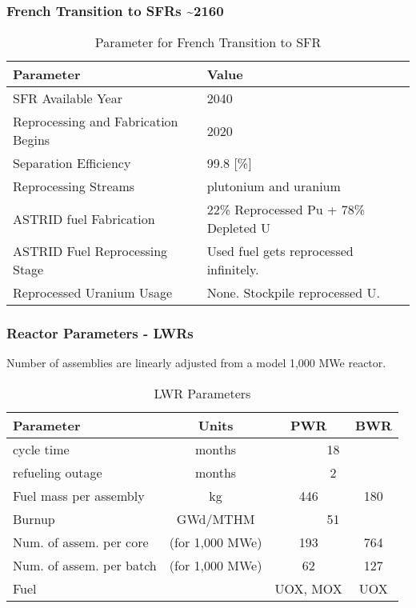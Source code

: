 \begin{frame}
    \frametitle{French Transition to SFRs \textasciitilde 2160}
    
\begin{table}[h]
    \centering
    \begin{tabularx}{\textwidth}{bb}
        \hline
        Parameter & Value \\
        \hline
        \gls{SFR} Available Year & 2040 \\
        Reprocessing and Fabrication Begins & 2020 \\
        Separation Efficiency & 99.8 [\%] \\
        Reprocessing Streams & plutonium and uranium \\
        ASTRID fuel Fabrication &  \small{22\% Reprocessed Pu + 78\% Depleted U}  \\
        ASTRID Fuel Reprocessing Stage &  Used fuel gets reprocessed infinitely. \\
        Reprocessed Uranium Usage &  None. Stockpile reprocessed U. \\
        \hline
    \end{tabularx}
    \caption {Parameter for French Transition to \gls{SFR}}
    \label{tab:sim_france}
\end{table}

\end{frame}


\begin{frame}
    \frametitle{Reactor Parameters - \glspl{LWR} }
    Number of assemblies are linearly adjusted from a model 1,000 MWe reactor.
    \begin{table}[h]
    \centering
    \begin{tabularx}{\textwidth}{bccc}
        \hline
        Parameter & Units & PWR & BWR \\
        \hline
        cycle time & months & \multicolumn{2}{c}{18}   \\ 
        refueling outage & months & \multicolumn{2}{c}{2}\\
        Fuel mass per assembly & kg & 446 & 180 \\
        Burnup & GWd/MTHM & \multicolumn{2}{c}{51} \\
        \small{Num. of assem. per core} & (for 1,000 MWe) & 193  & 764 \\
        \small{Num. of assem. per batch} & (for 1,000 MWe) & 62 & 127 \\
        Fuel & & \gls{UOX}, \gls{MOX} & \gls{UOX}  \\
        \hline
    \end{tabularx}
    \caption {\gls{LWR} Parameters}
    \label{tab:lwr}
    \end{table}
\end{frame}


